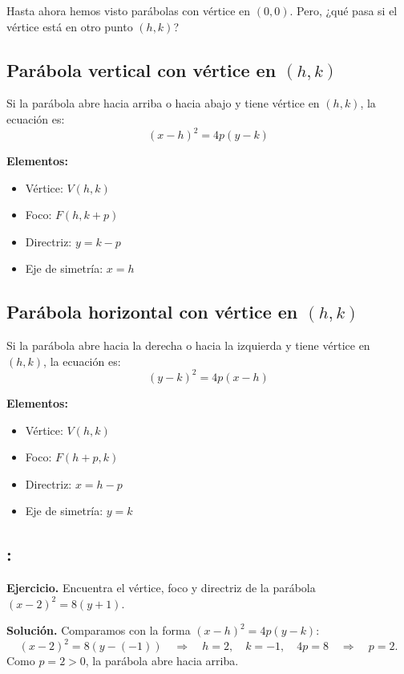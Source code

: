 \documentclass[12pt,a4paper]{article}
\begin{document}
	Hasta ahora hemos visto parábolas con vértice en \((0,0)\). Pero, ¿qué pasa si el vértice está en otro punto \((h,k)\)?

	\subsection*{Parábola vertical con vértice en \((h,k)\)}

	Si la parábola abre hacia arriba o hacia abajo y tiene vértice en \((h,k)\), la ecuación es:
	\[
	\boxed{(x-h)^2=4p(y-k)}
	\]

	\textbf{Elementos:}
	\begin{itemize}
		\item Vértice: \(V(h,k)\)
		\item Foco: \(F(h,k+p)\)
		\item Directriz: \(y=k-p\)
		\item Eje de simetría: \(x=h\)
	\end{itemize}

	\subsection*{Parábola horizontal con vértice en \((h,k)\)}

	Si la parábola abre hacia la derecha o hacia la izquierda y tiene vértice en \((h,k)\), la ecuación es:
	\[
	\boxed{(y-k)^2=4p(x-h)}
	\]

	\textbf{Elementos:}
	\begin{itemize}
		\item Vértice: \(V(h,k)\)
		\item Foco: \(F(h+p,k)\)
		\item Directriz: \(x=h-p\)
		\item Eje de simetría: \(y=k\)
	\end{itemize}

	\subsection*{{\color{blue!40!red}{Ejemplo 4}}: \color{blue!80!black}{Parábola con vértice fuera del origen}}

	\textbf{Ejercicio.} Encuentra el vértice, foco y directriz de la parábola \((x-2)^2=8(y+1)\).

	\bigskip

	\textbf{Solución.} Comparamos con la forma \((x-h)^2=4p(y-k)\):
	\[
	(x-2)^2=8(y-(-1)) \quad\Rightarrow\quad h=2,\quad k=-1,\quad 4p=8 \quad\Rightarrow\quad p=2.
	\]
	Como \(p=2>0\), la parábola abre hacia arriba.
\end{document}
